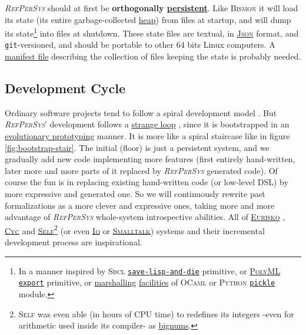 \documentclass{IEEEtran}
\newcommand{\RefPerSys}{{\textit{\textsc{RefPerSys}}}}
\begin{document}
{\RefPerSys} should at first be \textbf{orthogonally
  \href{https://en.wikipedia.org/wiki/Persistence\_(computer\_science)}{persistent}}. Like
\textsc{Bismon} \cite{Starynkevitch:2019:bismon-draft} it will load
its state (its entire garbage-collected
\href{https://en.wikipedia.org/wiki/Memory\_management#HEAP}{heap})
from files at startup, and will dump its state\footnote{In a manner
inspired by \textsc{Sbcl}
\href{http://www.sbcl.org/manual/index.html\#Saving-a-Core-Image}{\texttt{save-lisp-and-die}}
primitive, or \href{https://www.polyml.org/}{\textsc{PolyML}}
\href{https://www.polyml.org/documentation/Reference/PolyMLStructure.html\#export}{\texttt{export}}
primitive, or
\href{https://en.wikipedia.org/wiki/Marshalling_(computer_science)}{marshalling}
\href{https://caml.inria.fr/pub/docs/manual-ocaml/libref/Marshal.html}{facilities} of \textsc{OCaml} or \textsc{Python}
\href{https://docs.python.org/3/library/pickle.html}{\texttt{pickle}}
module.} into files at shutdown. These state files are
textual, in \href{http://json.org/}{\textsc{Json}} format, and \texttt{git}-versioned, and should be portable to
other 64 bits Linux computers. A
\href{https://en.wikipedia.org/wiki/Manifest\_file}{manifest file}
describing the collection of files keeping the state is probably
needed.


\subsection{Development Cycle}
\label{subsec:dev-cycle}

Ordinary software projects tend to follow a spiral development model
\cite{boehm:1988:spiral}.
But \RefPerSys' development follows a
\href{https://en.wikipedia.org/wiki/Strange_loop}{strange loop}
\cite{hofstadter:2007:strange-loop}, since it is bootstrapped in an
\href{https://en.wikipedia.org/wiki/Software\_prototyping\#Evolutionary\_prototyping}{evolutionary
  prototyping} manner. It is more like a spiral staircase like in
figure \ref{fig:bootstrap-stair}. The initial (floor) is just a
persistent system, and we gradually add new code implementing more
features (first entirely hand-written, later more and more parts of it
replaced by {\RefPerSys} generated code). Of course the fun is in
replacing existing hand-written code (or low-level DSL) by more
expressive and generated one. So we will continuously rewrite past
formalizations as a more clever and expressive ones, taking more and
more advantage of {\RefPerSys} whole-system introspective abilities.
All of \href{https://en.wikipedia.org/wiki/Eurisko}{\textsc{Eurisko}}
\cite{Lenat:1983:Eurisko},
\href{https://en.wikipedia.org/wiki/Cyc}{\textsc{Cyc}}
\cite{Lenat:1991:ev-cycl} and
\href{https://en.wikipedia.org/wiki/Self\_(programming_language)}{\textsc{Self}}\footnote{\textsc{Self}
was even able (in hours of CPU time) to redefines its integers -even
for arithmetic used inside its compiler- as
\href{https://en.wikipedia.org/wiki/Arbitrary-precision_arithmetic}{bignums}.}
\cite{chambers:1991:efficient} (or even
\href{https://iolanguage.org/}{\textsc{Io}} or
\href{https://en.wikipedia.org/wiki/Smalltalk}{\textsc{Smalltalk}})
systems and their incremental development process are inspirational.
\end{document}
